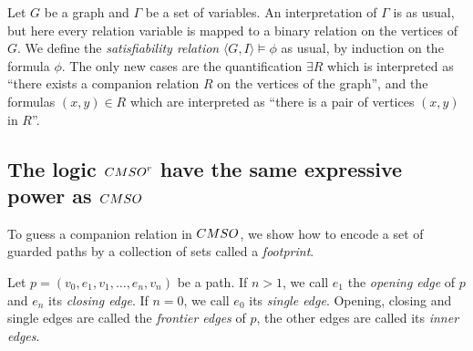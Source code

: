 \begin{definition}
Let $G$ be a graph and $\Gamma$ be a set of variables.  An interpretation of $\Gamma$ is as usual, but here every relation variable is mapped to a binary relation on the vertices of $G$.  We define the \emph{satisfiability relation} $\langle G, I\rangle\models \phi$ as usual, by induction on the formula $\phi$. The only new cases are the quantification  $\exists R$ which is interpreted as ``there exists a companion relation $R$ on the vertices of the graph'', and the formulas $(x,y)\in R$ which are interpreted as ``there is a pair of vertices $(x,y)$ in $R$''. 
\end{definition}


\subsection{The logic $\CMSO^r$ have the same expressive power as $\CMSO$}



To guess a companion relation in $\CMSO$, we show how to encode a set of guarded paths by a collection of sets called a \emph{footprint}.


\begin{definition} Let $p=(v_0,e_1,v_1,\dots,e_n,v_n)$ be a path. If $n>1$, we call $e_1$ the \emph{opening edge} of $p$ and $e_n$ its \emph{closing edge}. If $n=0$, we call $e_0$ its \emph{single edge}.  Opening, closing and single edges are called the \emph{frontier edges} of $p$, the other edges are called its \emph{inner edges}.  
 \end{definition}


